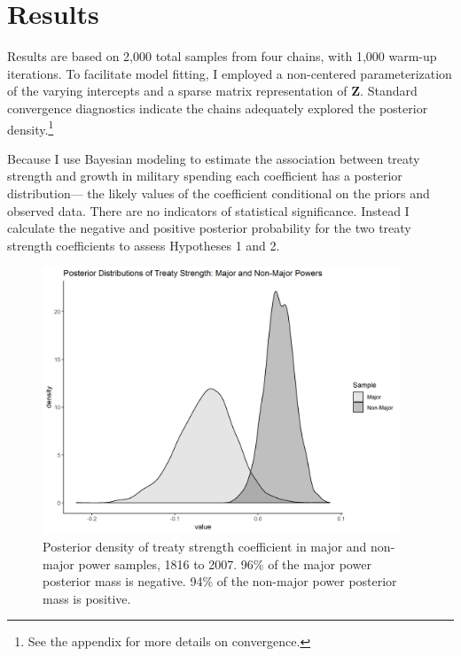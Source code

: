 \documentclass[12pt]{article}
\begin{document}
\section{Results}


Results are based on 2,000 total samples from four chains, with 1,000 warm-up iterations. 
To facilitate model fitting, I employed a non-centered parameterization of the varying intercepts and a sparse matrix representation of \textbf{Z}. 
Standard convergence diagnostics indicate the chains adequately explored the posterior density.\footnote{See the appendix for more details on convergence.} 


Because I use Bayesian modeling to estimate the association between treaty strength and growth in military spending each coefficient has a posterior distribution--- the likely values of the coefficient conditional on the priors and observed data.
There are no indicators of statistical significance. 
Instead I calculate the negative and positive posterior probability for the two treaty strength coefficients to assess Hypotheses 1 and 2.


\begin{figure}[htbp]
	\centering
		\includegraphics[width=0.95\textwidth]{../figures/str-dens.png}
	\caption{Posterior density of treaty strength coefficient in major and non-major power samples, 1816 to 2007. 96\% of the major power posterior mass is negative. 94\% of the non-major power posterior mass is positive.}
	\label{fig:str-dens}
\end{figure}
\end{document}
